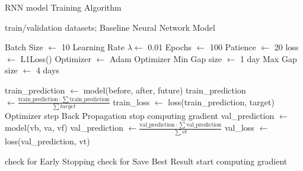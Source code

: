 \begin{algorithm}[H]
	\caption{RNN model Training Algorithm}\label{alg:grruntraining}
	\begin{algorithmic}
		\Require train/validation datasets; Baseline Neural Network Model

		\State Batch Size $\gets$ 10
		\State Learning Rate $\lambda \gets$ 0.01
		\State Epochs $\gets$ 100
		\State Patience $\gets$ 20
		\State loss $\gets$ L1Loss()
		\State Optimizer $\gets$ Adam Optimizer
		\State Min Gap size $\gets$ 1 day
		\State Max Gap size $\gets$ 4 days
		\State

		\State train\_prediction $\gets$ model(before, after, future) 
		\State train\_prediction $\gets \frac{\text{train\_prediction} \cdot \sum\text{train\_prediction}}{\sum target}$ 
		\State train\_loss $\gets$ loss(train\_prediction, target)
		\State Optimizer step
		\State Back Propagation
		\EndFor
		\State stop computing gradient
		\State val\_prediction $\gets$ model(vb, va, vf) 
		\State val\_prediction $\gets \frac{\text{val\_prediction} \cdot \sum\text{val\_prediction}}{\sum vt}$ 
		\State val\_loss $\gets$ loss(val\_prediction, vt)
		\EndFor

		\State check for Early Stopping
		\State check for Save Best Result
		\State start computing gradient
		\EndFor
	\end{algorithmic}
\end{algorithm}



